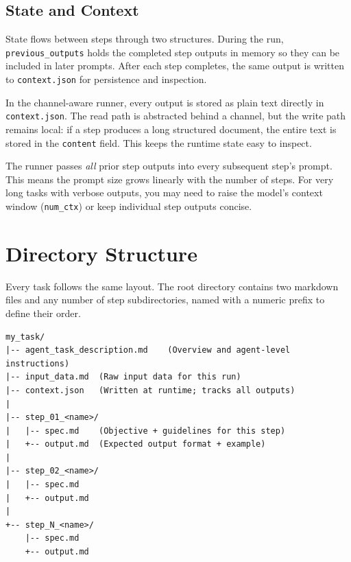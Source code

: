 \documentclass[12pt, a4paper]{article}
\begin{document}
\subsection{State and Context}

State flows between steps through two structures. During the run, \texttt{previous\_outputs} holds the completed step outputs in memory so they can be included in later prompts. After each step completes, the same output is written to \texttt{context.json} for persistence and inspection.

In the channel-aware runner, every output is stored as plain text directly in \texttt{context.json}. The read path is abstracted behind a channel, but the write path remains local: if a step produces a long structured document, the entire text is stored in the \texttt{content} field. This keeps the runtime state easy to inspect.

\begin{warnbox}
The runner passes \textit{all} prior step outputs into every subsequent step's prompt. This means the prompt size grows linearly with the number of steps. For very long tasks with verbose outputs, you may need to raise the model's context window (\texttt{num\_ctx}) or keep individual step outputs concise.
\end{warnbox}

\section{Directory Structure}

Every task follows the same layout. The root directory contains two markdown files and any number of step subdirectories, named with a numeric prefix to define their order.

\begin{lstlisting}
my_task/
|-- agent_task_description.md    (Overview and agent-level instructions)
|-- input_data.md  (Raw input data for this run)
|-- context.json   (Written at runtime; tracks all outputs)
|
|-- step_01_<name>/
|   |-- spec.md    (Objective + guidelines for this step)
|   +-- output.md  (Expected output format + example)
|
|-- step_02_<name>/
|   |-- spec.md
|   +-- output.md
|
+-- step_N_<name>/
    |-- spec.md
    +-- output.md
\end{lstlisting}

\end{document}
